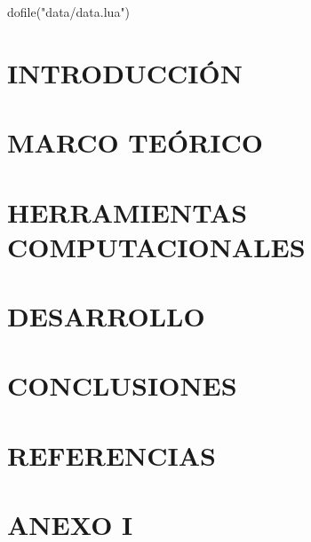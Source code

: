 \documentclass[oneside,a4paper,spanish,links,12pt]{book}
\begin{document}
\begin{luacode}
dofile("data/data.lua")
\end{luacode}



\tableofcontents \pagebreak
\listoffigures \pagebreak
\listoftables \pagebreak
 \makenomenclature \pagebreak


\chapter{INTRODUCCIÓN} \label{capitulo:INTRODUCCION}
 \label{capitulo:1_INTRODUCCION} \pagebreak

\chapter{MARCO TEÓRICO} \label{capitulo:MARCO_TEORICO}
 \label{capitulo:2_MCI} \pagebreak
 \label{capitulo:2_MRCVC} \pagebreak
 \label{capitulo:2_CFD} \pagebreak

\chapter{HERRAMIENTAS COMPUTACIONALES} \label{capitulo:HERRAMIENTAS_COMPUTACIONALES}
 \label{capitulo:3_icesym} \pagebreak
 \label{capitulo:3_optimizador} \pagebreak
 \label{capitulo:3_openfoam} \pagebreak

\chapter{DESARROLLO} \label{capitulo:DESARROLLO}
 \label{capitulo:4_primer_iteracion} \pagebreak
 \label{capitulo:4_flujometrias} \pagebreak
 \label{capitulo:4_segunda_iteracion} \pagebreak


\chapter{CONCLUSIONES} \label{capitulo:5_conclusiones}
 \label{capitulo:5_conclusiones} \pagebreak

\chapter{REFERENCIAS}
\printbibliography[heading=none] \pagebreak

\chapter{ANEXO I}
 \pagebreak
\end{document}
